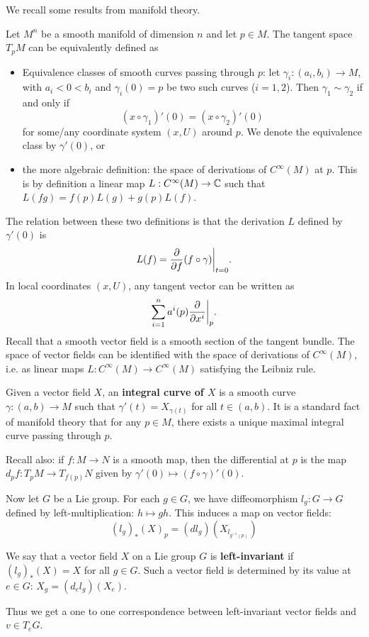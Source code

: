 \documentclass[11pt, english]{article}
\begin{document}
We recall some results from manifold theory.

Let $M^n$ be a smooth manifold of dimension $n$ and let $p \in M$. The tangent space $T_pM$ can be equivalently defined as
\begin{itemize}
\item Equivalence classes of smooth curves passing through $p$: let $\gamma_i:(a_i,b_i) \to M$, with $a_i < 0 < b_i$ and $\gamma_i(0)=p$ be two such curves ($i=1,2$). Then $\gamma_1 \sim \gamma_2$ if and only if 
$$
(x \circ \gamma_1)'(0) = (x \circ \gamma_2)'(0)
$$
for some/any coordinate system $(x,U)$ around $p$. We denote the equivalence class by $\gamma'(0)$, or
\item the more algebraic definition: the space of derivations of $C^\infty (M)$ at $p$. This is by definition a linear map $L:C^\infty(M) \to \mathbb{C}$ such that $L(fg) = f(p)L(g) + g(p)L(f)$.
\end{itemize}
The relation between these two definitions is that the derivation $L$ defined by $\gamma'(0)$ is
$$
L(f) = \restr{\dd{}{f}(f \circ \gamma)}{t=0}.
$$
In local coordinates $(x,U)$, any tangent vector can be written as
$$
\sum_{i=1}^n a^i(p) \restr{\dd{}{x^i}}{p}.
$$
Recall that a smooth vector field is a smooth section of the tangent bundle. The space of vector fields can be identified with the space of derivations of $C^\infty(M)$, i.e. as linear maps $L:C^\infty(M) \to C^\infty(M)$ satisfying the Leibniz rule.

Given a vector field $X$, an \textbf{integral curve of $X$} is a smooth curve $\gamma:(a,b) \to M$ such that $\gamma'(t) = X_{\gamma(t)}$ for all $t \in (a,b)$. It is a standard fact of manifold theory that for any $p \in M$, there exists a unique maximal integral curve passing through $p$. 

Recall also: if $f:M \to N$ is a smooth map, then the differential at $p$ is the map  $d_pf:T_pM \to T_{f(p)}N$ given by $\gamma'(0) \mapsto (f \circ \gamma)'(0)$. 

Now let $G$ be a Lie group. For each $g \in G$, we have diffeomorphism $l_g:G \to G$ defined by left-multiplication: $h \mapsto gh$. This induces a map on vector fields:
$$
(l_g)_\ast(X)_p = (dl_g)(X_{l_{g^{-1}(p)}})
$$

We say that a vector field $X$ on a Lie group $G$ is \textbf{left-invariant} if $(l_g)_\ast(X)=X$ for all $g \in G$. Such a vector field is determined by its value at $e \in G$: $X_g = (d_e l_g)(X_e)$.

Thus we get a one to one correspondence between left-invariant vector fields and $v \in T_eG$.
 
\end{document}

